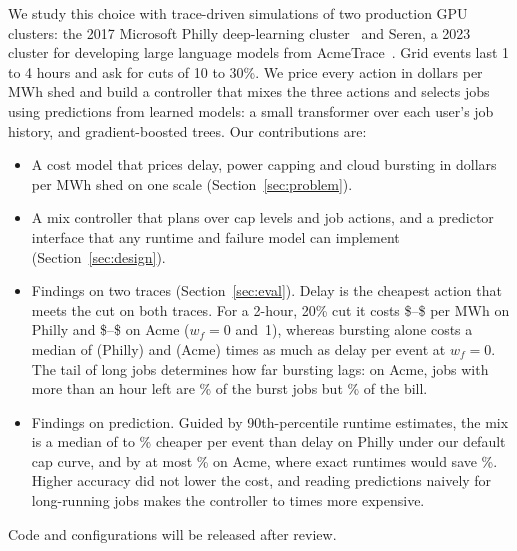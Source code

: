 We study this choice with trace-driven simulations of two production GPU clusters: the 2017 Microsoft Philly deep-learning cluster~\cite{jeon19} and Seren, a 2023 cluster for developing large language models from AcmeTrace~\cite{hu24}. Grid events last 1 to 4 hours and ask for cuts of 10 to 30\%. We price every action in dollars per MWh shed and build a controller that mixes the three actions and selects jobs using predictions from learned models: a small transformer over each user's job history, and gradient-boosted trees. Our contributions are:
\begin{itemize}
\item A cost model that prices delay, power capping and cloud bursting in dollars per MWh shed on one scale (Section~\ref{sec:problem}).
\item A mix controller that plans over cap levels and job actions, and a predictor interface that any runtime and failure model can implement (Section~\ref{sec:design}).
\item Findings on two traces (Section~\ref{sec:eval}). Delay is the cheapest action that meets the cut on both traces. For a 2-hour, 20\% cut it costs \$\DefDelayUsdZero{}--\$\DefDelayUsdOne{} per MWh on Philly and \$\AcmeDefDelayUsdZero{}--\$\AcmeDefDelayUsdOne{} on Acme ($w_f=0$ and~1), whereas bursting alone costs a median of \BurstOverDelayDefaultZero{} (Philly) and \AcmeBurstOverDelayDefaultZero{} (Acme) times as much as delay per event at $w_f=0$. The tail of long jobs determines how far bursting lags: on Acme, jobs with more than an hour left are \AcmeBurstLongJobsPct\% of the burst jobs but \AcmeBurstLongUsdPct\% of the bill.
\item Findings on prediction. Guided by 90th-percentile runtime estimates, the mix is a median of \LearnedGainMinPct{} to \LearnedGainMaxPct\% cheaper per event than delay on Philly under our default cap curve, and by at most \AcmeLearnedMixGainMaxPct\% on Acme, where exact runtimes would save \AcmeOracleMixGainPctZero\%. Higher accuracy did not lower the cost, and reading predictions naively for long-running jobs makes the controller \ContractOverHoldMin{} to \ContractOverHoldMax{} times more expensive.
\end{itemize}
Code and configurations will be released after review.
